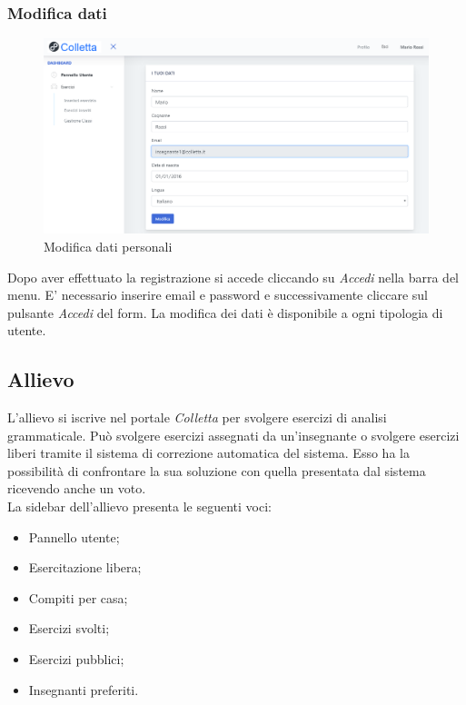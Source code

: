     \subsubsection{Modifica dati}
    	\begin{figure}[H]
        	\centering
        	\includegraphics[width=1\linewidth]{sez/img/autenticazione/modati.PNG} 
        	\caption{Modifica dati personali}\label{fig:1}
    	\end{figure}
    Dopo aver effettuato la registrazione si accede cliccando su \textit{Accedi} nella barra del menu. E' necessario inserire email e password e successivamente cliccare sul pulsante \textit{Accedi} del form. La modifica dei dati è disponibile a ogni tipologia di utente.

\newpage
    \subsection{Allievo}
      L'allievo si iscrive nel portale \textit{Colletta} per svolgere esercizi di analisi grammaticale. Può svolgere esercizi assegnati da un'insegnante o svolgere esercizi liberi tramite il sistema di correzione automatica del sistema. Esso ha la possibilità di confrontare la sua soluzione con quella presentata dal sistema ricevendo anche un voto.
      \\La sidebar dell'allievo presenta le seguenti voci:
            \begin{itemize}
                \item Pannello utente;
                \item Esercitazione libera;
                \item Compiti per casa;
                \item Esercizi svolti;
                \item Esercizi pubblici;
                \item Insegnanti preferiti.
            \end{itemize}
            

